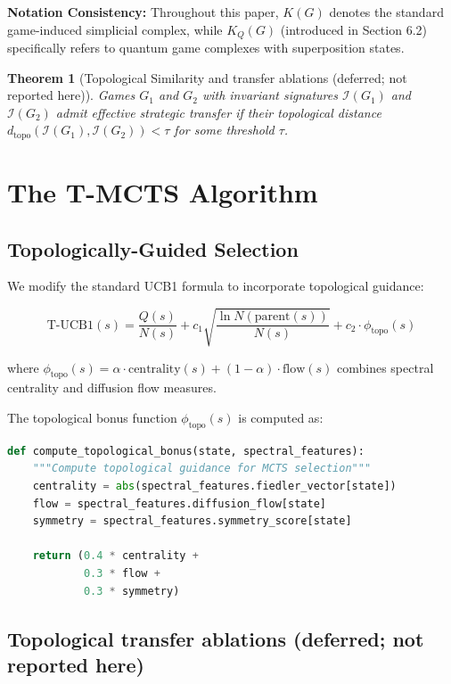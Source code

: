 \documentclass{article}
\newtheorem{theorem}{Theorem}
\begin{document}
\textbf{Notation Consistency:} Throughout this paper, $K(G)$ denotes the standard game-induced simplicial complex, while $K_Q(G)$ (introduced in Section 6.2) specifically refers to quantum game complexes with superposition states.

\begin{theorem}[Topological Similarity and transfer ablations (deferred; not reported here)]
Games $G_1$ and $G_2$ with invariant signatures $\mathcal{I}(G_1)$ and $\mathcal{I}(G_2)$ admit effective strategic transfer if their topological distance $d_{\text{topo}}(\mathcal{I}(G_1), \mathcal{I}(G_2)) < \tau$ for some threshold $\tau$.
\end{theorem}

\section{The T-MCTS Algorithm}

\subsection{Topologically-Guided Selection}

We modify the standard UCB1 formula to incorporate topological guidance:

$$\text{T-UCB1}(s) = \frac{Q(s)}{N(s)} + c_1\sqrt{\frac{\ln N(\text{parent}(s))}{N(s)}} + c_2 \cdot \phi_{\text{topo}}(s)$$

where $\phi_{\text{topo}}(s) = \alpha \cdot \text{centrality}(s) + (1-\alpha) \cdot \text{flow}(s)$ combines spectral centrality and diffusion flow measures.

The topological bonus function $\phi_{\text{topo}}(s)$ is computed as:

\begin{lstlisting}[language=Python, caption=Topological Bonus Computation]
def compute_topological_bonus(state, spectral_features):
    """Compute topological guidance for MCTS selection"""
    centrality = abs(spectral_features.fiedler_vector[state])
    flow = spectral_features.diffusion_flow[state]
    symmetry = spectral_features.symmetry_score[state]
    
    return (0.4 * centrality + 
            0.3 * flow + 
            0.3 * symmetry)
\end{lstlisting}

\subsection{Topological transfer ablations (deferred; not reported here)}
\end{document}
